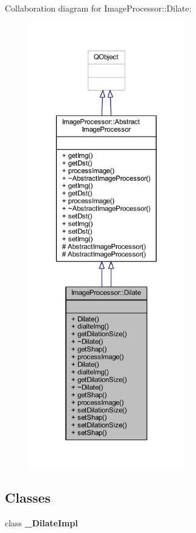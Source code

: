 Collaboration diagram for Image\+Processor\+:\+:Dilate\+:\nopagebreak
\begin{figure}[H]
\begin{center}
\leavevmode
\includegraphics[height=550pt]{d6/d27/class_image_processor_1_1_dilate__coll__graph}
\end{center}
\end{figure}
\subsection*{Classes}
\begin{DoxyCompactItemize}
\item 
class {\bfseries \+\_\+\+Dilate\+Impl}
\end{DoxyCompactItemize}
